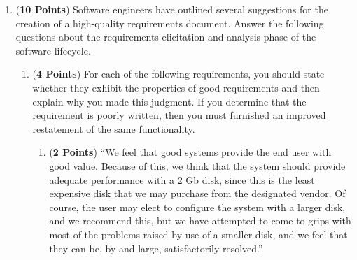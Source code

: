 \documentclass[12pt,epsf,psfig,graphics]{article}
\begin{document}
\begin{enumerate}
\begin{enumerate}




        \end{enumerate}

\newpage

\item ({\bf 10 Points}) Software engineers have outlined several suggestions for the creation of a high-quality
  requirements document.  Answer the following questions about the requirements elicitation and analysis phase of the
  software lifecycle.


        \begin{enumerate}

        \item ({\bf 4 Points}) For each of the following requirements,
          you should state whether they exhibit the properties of good
          requirements and then explain why you made this judgment.
          If you determine that the requirement is poorly written,
          then you must furnished an improved restatement of the same
          functionality.

          \begin{enumerate}

            \item ({\bf 2 Points}) ``We feel that good systems provide
              the end user with good value.  Because of this, we think
              that the system should provide adequate performance with
              a 2 Gb disk, since this is the least expensive disk that
              we may purchase from the designated vendor.  Of course,
              the user may elect to configure the system with a larger
              disk, and we recommend this, but we have attempted to
              come to grips with most of the problems raised by use of
              a smaller disk, and we feel that they can be, by and
              large, satisfactorily resolved.''


\end{enumerate}
\end{enumerate}
\end{enumerate}
\end{document}
